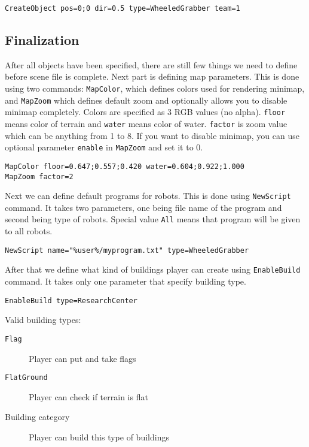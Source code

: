 \begin{lstlisting}[style=scene]
CreateObject pos=0;0 dir=0.5 type=WheeledGrabber team=1
\end{lstlisting}


\subsection{Finalization}

After all objects have been specified, there are still few things we need to define before scene file is complete. Next part is defining map parameters. This is done using two commands: \texttt{MapColor}, which defines colors used for rendering minimap, and \texttt{MapZoom} which defines default zoom and optionally allows you to disable minimap completely. Colors are specified as 3 RGB values (no alpha). \texttt{floor} means color of terrain and \texttt{water} means color of water. \texttt{factor} is zoom value which can be anything from 1 to 8. If you want to disable minimap, you can use optional parameter \texttt{enable} in \texttt{MapZoom} and set it to 0.

\begin{lstlisting}[style=scene]
MapColor floor=0.647;0.557;0.420 water=0.604;0.922;1.000
MapZoom factor=2
\end{lstlisting}

Next we can define default programs for robots. This is done using \texttt{NewScript} command. It takes two parameters, one being file name of the program and second being type of robots. Special value \texttt{All} means that program will be given to all robots.

\begin{lstlisting}[style=scene]
NewScript name="%user%/myprogram.txt" type=WheeledGrabber
\end{lstlisting}

After that we define what kind of buildings player can create using \texttt{EnableBuild} command. It takes only one parameter that specify building type.

\begin{lstlisting}[style=scene]
EnableBuild type=ResearchCenter
\end{lstlisting}

Valid building types:


\begin{description}
    \item[\texttt{Flag}] Player can put and take flags
    \item[\texttt{FlatGround}] Player can check if terrain is flat
    \item[Building category] Player can build this type of buildings
\end{description}

